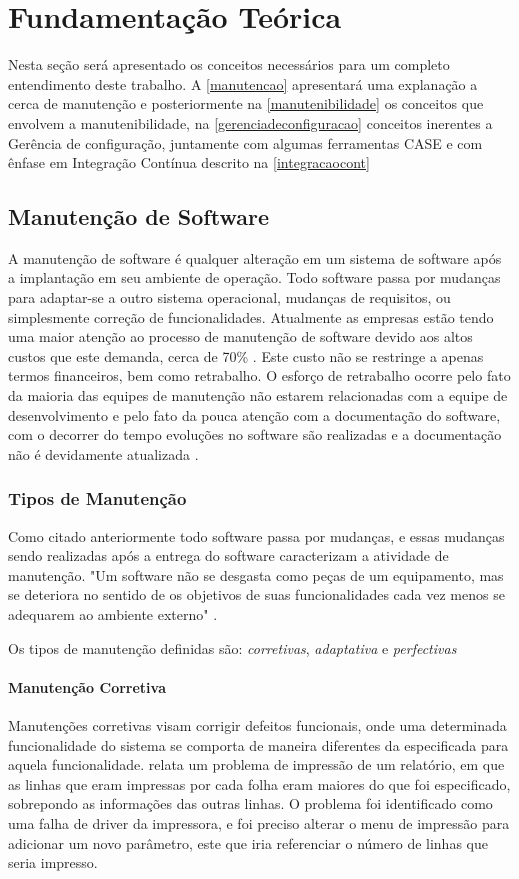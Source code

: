 \chapter{Fundamentação Teórica}\label{fundamentacao}
Nesta seção será apresentado os conceitos necessários para um completo entendimento deste trabalho. A \autoref{manutencao} apresentará uma explanação a cerca de manutenção e posteriormente na \autoref{manutenibilidade} os conceitos que envolvem a manutenibilidade, na \autoref{gerenciadeconfiguracao} conceitos inerentes a Gerência de configuração, juntamente com algumas ferramentas CASE e com ênfase em Integração Contínua descrito na \autoref{integracaocont}

\section{Manutenção de Software}\label{manutencao}
A manutenção de software é qualquer alteração em um sistema de software após a implantação em seu ambiente de operação. Todo software passa por mudanças para adaptar-se a outro sistema operacional, mudanças de requisitos, ou simplesmente correção de funcionalidades. Atualmente as empresas estão tendo uma maior atenção ao processo de manutenção de software devido aos altos custos que este demanda, cerca de 70\% \cite{pressman2010} \cite{pigoski1997}. Este custo não se restringe a apenas termos financeiros, bem como retrabalho. O esforço de retrabalho ocorre pelo fato da maioria das equipes de manutenção não estarem relacionadas com a equipe de desenvolvimento e pelo fato da pouca atenção com a documentação do software, com o decorrer do tempo evoluções no software são realizadas e a documentação não é devidamente atualizada \cite{sergio2005}.

\subsection{Tipos de Manutenção}
Como citado anteriormente todo software passa por mudanças, e essas mudanças sendo realizadas após a entrega do software caracterizam a atividade de manutenção. "Um software não se desgasta como peças de um equipamento, mas se deteriora no sentido de os objetivos de suas funcionalidades cada vez menos se adequarem ao ambiente externo" \space  \cite[p.~33]{matheus2007}.

Os tipos de manutenção definidas são:  \textit{corretivas}, \textit{adaptativa} e \textit{perfectivas} 
\subsubsection{Manutenção Corretiva}
Manutenções corretivas visam corrigir defeitos funcionais, onde uma determinada funcionalidade do sistema se comporta de maneira diferentes da especificada para aquela funcionalidade.
 relata um problema de impressão de um relatório, em que as linhas que eram impressas por cada folha eram maiores do que foi especificado, sobrepondo as informações das outras linhas. O problema foi identificado como uma falha de driver da impressora, e foi preciso alterar o menu de impressão para adicionar um novo parâmetro, este que iria referenciar o número de linhas que seria impresso.
